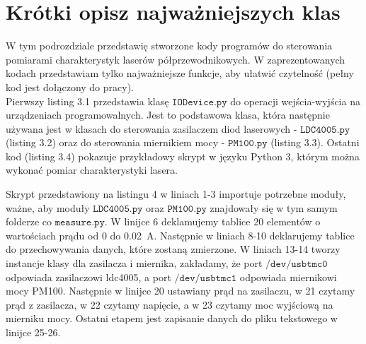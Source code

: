 \section{Krótki opisz najważniejszych klas}
W tym podrozdziale przedstawię stworzone kody programów do sterowania pomiarami charakterystyk laserów półprzewodnikowych.
 W zaprezentowanych kodach przedstawiam tylko najważniejsze funkcje, aby ułatwić czytelność (pełny kod jest dołączony do pracy). \\
Pierwszy listing 3.1 przedstawia klasę $\mathtt{IODevice.py}$ do operacji  wejścia-wyjścia na urządzeniach programowalnych.
Jest to podstawowa klasa, która następnie używana jest w klasach do sterowania zasilaczem
diod laserowych - $\mathtt{LDC4005.py}$ (listing 3.2) oraz do sterowania miernikiem mocy - $\mathtt{PM100.py}$ (listing 3.3).
Ostatni kod (listing 3.4) pokazuje przykładowy skrypt w języku Python 3, którym można wykonać pomiar charakterystyki lasera.
\newpage



Skrypt przedstawiony na listingu 4 w liniach 1-3 importuje potrzebne moduły, ważne, aby moduły $\mathtt{LDC4005.py}$ oraz $\mathtt{PM100.py}$ znajdowały się w tym samym folderze co $\mathtt{measure.py}$.
W linijce 6 deklamujemy tablice 20 elementów o wartościach prądu od 0 do 0.02 \,A. Następnie w liniach 8-10 deklarujemy tablice do przechowywania danych, które zostaną zmierzone. W liniach 13-14 tworzy instancje klasy dla zasilacza i miernika, zakładamy, że port $\mathtt{/dev/usbtmc0}$ odpowiada zasilaczowi ldc4005, a port $\mathtt{/dev/usbtmc1}$ odpowiada miernikowi mocy PM100.
Następnie w linijce 20 ustawiany prąd na zasilaczu, w 21 czytamy prąd z zasilacza, w 22 czytamy napięcie, a w 23 czytamy moc wyjściową na mierniku mocy. Ostatni etapem jest zapisanie danych do pliku tekstowego w linijce 25-26.

